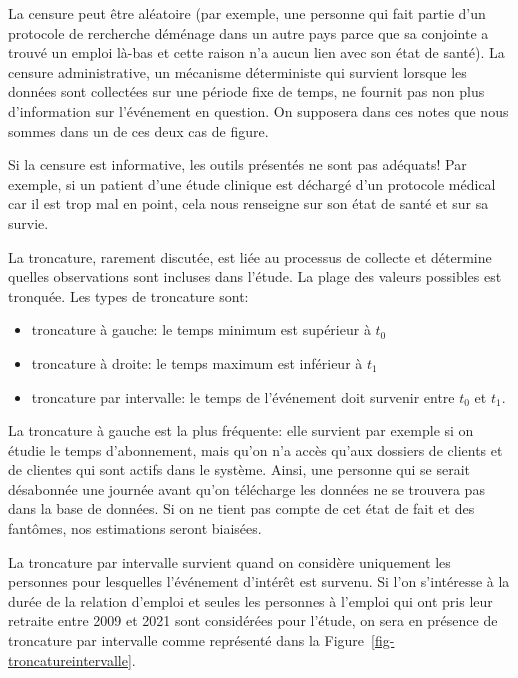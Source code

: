 \documentclass[
  11pt,
  letterpaper,
]{scrbook}
\providecommand{\tightlist}{%
  \setlength{\itemsep}{0pt}\setlength{\parskip}{0pt}}\usepackage{longtable,booktabs,array}
\theoremstyle{definition}
\theoremstyle{remark}
\begin{document}
La censure peut être aléatoire (par exemple, une personne qui fait
partie d'un protocole de rercherche déménage dans un autre pays parce
que sa conjointe a trouvé un emploi là-bas et cette raison n'a aucun
lien avec son état de santé). La censure administrative, un mécanisme
déterministe qui survient lorsque les données sont collectées sur une
période fixe de temps, ne fournit pas non plus d'information sur
l'événement en question. On supposera dans ces notes que nous sommes
dans un de ces deux cas de figure.

Si la censure est informative, les outils présentés ne sont pas
adéquats! Par exemple, si un patient d'une étude clinique est déchargé
d'un protocole médical car il est trop mal en point, cela nous renseigne
sur son état de santé et sur sa survie.

La troncature, rarement discutée, est liée au processus de collecte et
détermine quelles observations sont incluses dans l'étude. La plage des
valeurs possibles est tronquée. Les types de troncature sont:

\begin{itemize}
\tightlist
\item
  troncature à gauche: le temps minimum est supérieur à \(t_0\)
\item
  troncature à droite: le temps maximum est inférieur à \(t_1\)
\item
  troncature par intervalle: le temps de l'événement doit survenir entre
  \(t_0\) et \(t_1\).
\end{itemize}

La troncature à gauche est la plus fréquente: elle survient par exemple
si on étudie le temps d'abonnement, mais qu'on n'a accès qu'aux dossiers
de clients et de clientes qui sont actifs dans le système. Ainsi, une
personne qui se serait désabonnée une journée avant qu'on télécharge les
données ne se trouvera pas dans la base de données. Si on ne tient pas
compte de cet état de fait et des fantômes, nos estimations seront
biaisées.

La troncature par intervalle survient quand on considère uniquement les
personnes pour lesquelles l'événement d'intérêt est survenu. Si l'on
s'intéresse à la durée de la relation d'emploi et seules les personnes à
l'emploi qui ont pris leur retraite entre 2009 et 2021 sont considérées
pour l'étude, on sera en présence de troncature par intervalle comme
représenté dans la Figure~\ref{fig-troncatureintervalle}.
\end{document}
